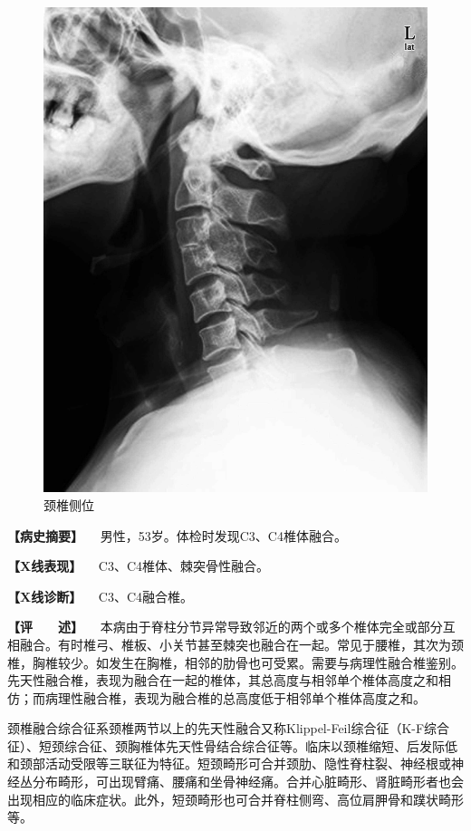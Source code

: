 \begin{figure}[!htbp]
 \centering
 \includegraphics{./images/Image00017.jpg}
 \captionsetup{justification=centering}
 \caption{颈椎侧位}
 \label{fig2-2-1}
  \end{figure} 

\textbf{【病史摘要】} 　男性，53岁。体检时发现C3、C4椎体融合。

\textbf{【X线表现】} 　C3、C4椎体、棘突骨性融合。

\textbf{【X线诊断】} 　C3、C4融合椎。

\textbf{【评　　述】}
　本病由于脊柱分节异常导致邻近的两个或多个椎体完全或部分互相融合。有时椎弓、椎板、小关节甚至棘突也融合在一起。常见于腰椎，其次为颈椎，胸椎较少。如发生在胸椎，相邻的肋骨也可受累。需要与病理性融合椎鉴别。先天性融合椎，表现为融合在一起的椎体，其总高度与相邻单个椎体高度之和相仿；而病理性融合椎，表现为融合椎的总高度低于相邻单个椎体高度之和。

颈椎融合综合征系颈椎两节以上的先天性融合又称Klippel-Feil综合征（K-F综合征）、短颈综合征、颈胸椎体先天性骨结合综合征等。临床以颈椎缩短、后发际低和颈部活动受限等三联征为特征。短颈畸形可合并颈肋、隐性脊柱裂、神经根或神经丛分布畸形，可出现臂痛、腰痛和坐骨神经痛。合并心脏畸形、肾脏畸形者也会出现相应的临床症状。此外，短颈畸形也可合并脊柱侧弯、高位肩胛骨和蹼状畸形等。

